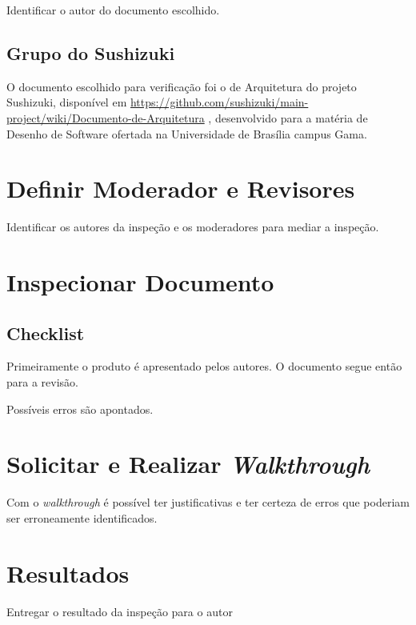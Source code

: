  Identificar o autor do documento escolhido. 

 \subsection{Grupo do Sushizuki}

 O documento escolhido para verificação foi o de Arquitetura do projeto Sushizuki, disponível em \url{https://github.com/sushizuki/main-project/wiki/Documento-de-Arquitetura} , desenvolvido para a matéria de Desenho de Software ofertada na Universidade de Brasília campus Gama.


 \section{Definir Moderador e Revisores}

 Identificar os autores da inspeção e os moderadores para mediar a inspeção. 

 \section{Inspecionar Documento}

 \subsection{Checklist}

 Primeiramente o produto é apresentado pelos autores. O documento segue então para a revisão.

 Possíveis erros são apontados.

 \section{Solicitar e Realizar \textit{Walkthrough}}

 Com o \textit{walkthrough} é possível ter justificativas e ter certeza de erros
 que poderiam ser erroneamente identificados. 

 \section{Resultados}

 Entregar o resultado da inspeção para o autor 

